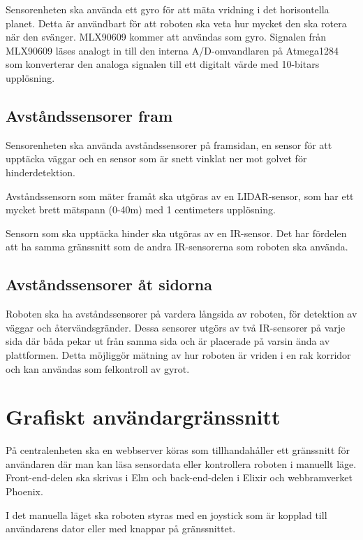 \documentclass[a4paper,titlepage,12pt]{article}
\begin{document}
	Sensorenheten ska använda ett gyro för att mäta vridning i det horisontella
	planet. Detta är användbart för att roboten ska veta hur mycket
	den ska rotera när den svänger. MLX90609 kommer att användas som gyro. Signalen från 
	MLX90609 läses analogt in till den interna A/D-omvandlaren på Atmega1284 som konverterar 
	den analoga signalen till ett digitalt värde med 10-bitars upplösning. 
	
	\subsection{Avståndssensorer fram}
	
	Sensorenheten ska använda avståndssensorer på framsidan, en sensor för att
	upptäcka väggar och en sensor som är snett vinklat ner mot golvet för hinderdetektion. 

	Avståndssensorn som mäter framåt ska utgöras av en LIDAR-sensor, som har
    ett mycket brett mätspann (0-40m) med 1 centimeters upplösning.

	Sensorn som ska upptäcka hinder ska utgöras av en IR-sensor. Det
	har fördelen att ha samma gränssnitt som de andra IR-sensorerna som roboten
	ska använda.

	\subsection{Avståndssensorer åt sidorna}
	Roboten ska ha avståndssensorer på vardera långsida av roboten, för
	detektion av väggar och återvändsgränder. Dessa sensorer utgörs av två 
    IR-sensorer på varje sida där båda pekar ut från samma sida och
	är placerade på varsin ända av plattformen. Detta möjliggör mätning av hur
	roboten är vriden i en rak korridor och kan användas som felkontroll av
	gyrot.
	
	\section{Grafiskt användargränssnitt}
	På centralenheten ska en webbserver köras som tillhandahåller ett gränssnitt
	för användaren där man kan läsa sensordata eller kontrollera roboten i
	manuellt läge. Front-end-delen ska skrivas i Elm och back-end-delen i Elixir
    och webbramverket Phoenix.

	I det manuella läget ska roboten styras med en joystick som är kopplad till användarens
	dator eller med knappar på gränssnittet.
	
\end{document}
